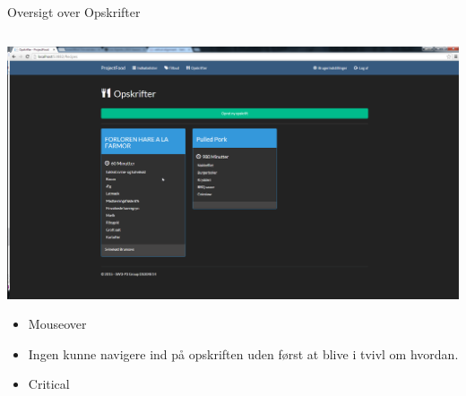 \begin{frame}{Oversigt over Opskrifter}

	
	\begin{minipage}[0.3\textheight]{\textwidth}
	\begin{columns}[T]
	\begin{column}{1\textwidth}
	 \includegraphics[width=1\textwidth,height=1\textheight,keepaspectratio, trim={1cm 0 0 16mm}, clip]{images/Screenshots/RecipeOld.png}
	 
	 	\begin{itemize}
	 	\item Mouseover
	 	\item Ingen kunne navigere ind på opskriften uden først at blive i tvivl om hvordan.
	 	\item Critical
	 	
	 	\end{itemize}
	
	\end{column}

	\end{columns}

  \end{minipage}
	
\end{frame}

